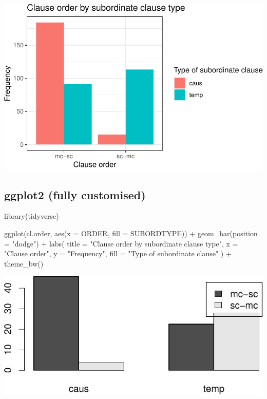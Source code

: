 \documentclass[
  11pt,
  letterpaper,
  DIV=11,
  numbers=noendperiod]{scrreprt}
\newenvironment{Shaded}{\begin{snugshade}}{\end{snugshade}}
\newcommand{\AttributeTok}[1]{\textcolor[rgb]{0.40,0.45,0.13}{#1}}
\newcommand{\FunctionTok}[1]{\textcolor[rgb]{0.28,0.35,0.67}{#1}}
\newcommand{\NormalTok}[1]{\textcolor[rgb]{0.00,0.23,0.31}{#1}}
\newcommand{\SpecialCharTok}[1]{\textcolor[rgb]{0.37,0.37,0.37}{#1}}
\newcommand{\StringTok}[1]{\textcolor[rgb]{0.13,0.47,0.30}{#1}}
\begin{document}
\includegraphics{Categorical_data_files/figure-pdf/unnamed-chunk-14-1.pdf}

\subsection{ggplot2 (fully customised)}

\begin{Shaded}
\begin{Highlighting}[]
\FunctionTok{library}\NormalTok{(tidyverse)}

\FunctionTok{ggplot}\NormalTok{(cl.order, }\FunctionTok{aes}\NormalTok{(}\AttributeTok{x =}\NormalTok{ ORDER, }\AttributeTok{fill =}\NormalTok{ SUBORDTYPE)) }\SpecialCharTok{+}
  \FunctionTok{geom\_bar}\NormalTok{(}\AttributeTok{position =} \StringTok{"dodge"}\NormalTok{) }\SpecialCharTok{+}
  \FunctionTok{labs}\NormalTok{(}
    \AttributeTok{title =} \StringTok{"Clause order by subordinate clause type"}\NormalTok{,}
    \AttributeTok{x =} \StringTok{"Clause order"}\NormalTok{,}
    \AttributeTok{y =} \StringTok{"Frequency"}\NormalTok{,}
    \AttributeTok{fill =} \StringTok{"Type of subordinate clause"}
\NormalTok{  ) }\SpecialCharTok{+}
  \FunctionTok{theme\_bw}\NormalTok{()}
\end{Highlighting}
\end{Shaded}

\includegraphics{Categorical_data_files/figure-pdf/unnamed-chunk-15-1.pdf}
\end{document}
